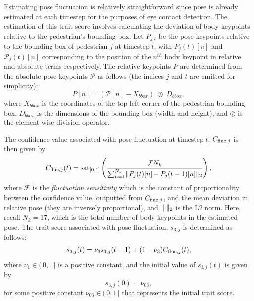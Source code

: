 \documentclass[journal]{IEEEtran}
\begin{document}
Estimating pose fluctuation is relatively straightforward since pose is already estimated at each timestep for the purposes of eye contact detection. The estimation of this trait score involves calculating the deviation of body keypoints relative to the pedestrian's bounding box. 
Let $P_{j,t}$ be the pose keypoints relative to the bounding box of pedestrian $j$ at timestep $t$, with $P_j(t)[n]$ and $\mathcal{P}_j(t)[n]$ corresponding to the position of the $n^{th}$ body keypoint in relative and absolute terms respectively. The relative keypoints $P$ are determined from the absolute pose keypoints $\mathcal{P}$ as follows (the indices $j$ and $t$ are omitted for simplicity):
\begin{equation}
    P[n] = (\mathcal{P}[n] - X_{bbox}) \;\oslash\; D_{bbox},
\end{equation}
where $X_{bbox}$ is the coordinates of the top left corner of the pedestrian bounding box, $D_{bbox}$ is the dimensions of the bounding box (width and height), and $\oslash$ is the element-wise division operator.


The confidence value associated with pose fluctuation at timestep $t$, ${C}_{{\rm fluc},j}$ is then given by
\begin{equation}
    {C}_{{\rm fluc},j}(t) = \mbox{sat}_{[0,1]}\left(\frac{\mathcal{F}N_{k}}{\sum_{n=1}^{N_k}\lVert P_j(t)[n] - P_j(t-1)[n]\rVert_2}\right),
\label{pose_conf}
\end{equation}
where $\mathcal{F}$ is the \textit{fluctuation sensitivity} which is the constant of proportionality between the confidence value, outputted from ${C}_{{\rm fluc},j}$, and the mean deviation in relative pose (they are inversely proportional), and $\lVert\cdot\rVert_2$ is the L2 norm. Here, recall $N_k=17$, which is the total number of body keypoints in the estimated pose.
The trait score associated with pose fluctuation, $s_{3, j}$ is determined as follows:
\begin{equation}
    \begin{gathered}
    s_{3,j}(t) = \nu_3s_{3,j}(t-1) + (1-\nu_3){C}_{{\rm fluc},j}(t),
    \end{gathered}
\label{pose_score}
\end{equation}
where $\nu_1\in (\,0,1\,]$ is a positive constant, and the initial value of $s_{3, j}(t)$ is given by
\begin{equation*}
    s_{3,j}(0) = \nu_{03},
\end{equation*}
for some positive constant $\nu_{03} \in (\,0,1\,]$ that represents the initial trait score.
\end{document}
